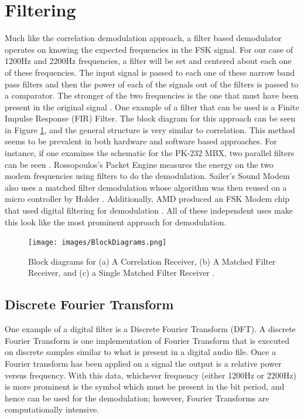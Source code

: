 \section{Filtering}
Much like the correlation demodulation approach, a filter based demodulator operates on knowing the expected frequencies in the FSK signal. For our case of 1200Hz and 2200Hz frequencies, a filter will be set and centered about each one of these frequencies. The input signal is passed to each one of these narrow band pass filters and then the power of each of the signals out of the filters is passed to a comparator. The stronger of the two frequencies is the one that must have been present in the original signal \cite{Watson1980}. One example of a filter that can be used is a Finite Impulse Response (FIR) Filter. The block diagram for this approach can be seen in Figure \ref{BlockDiagrams}, and the general structure is very similar to correlation. This method seems to be prevalent in both hardware and software based approaches. For instance, if one examines the schematic for the PK-232 MBX, two parallel filters can be seen \cite{Inc.2001}. Rossopoulos's Packet Engine measures the energy on the two modem frequencies using filters to do the demodulation. Sailer's Sound Modem also uses a matched filter demodulation \cite{Sailer1995} whose algorithm was then reused on a micro controller by Holder \cite{Holder2012}. Additionally, AMD produced an FSK Modem chip that used digital filtering for demodulation \cite{Devices1989}. All of these independent uses make this look like the most prominent approach for demodulation. 

\begin{figure}
  \centering
	\texttt{[image: images/BlockDiagrams.png]} 
	\caption{Block diagrams for (a) A Correlation Receiver, (b) A Matched Filter Receiver, and (c) a Single Matched Filter Receiver \cite{J.Das1986}.}
   \label{BlockDiagrams}
\end{figure}

\subsection{Discrete Fourier Transform}
One example of a digital filter is a Discrete Fourier Transform (DFT). A discrete Fourier Transform is one implementation of Fourier Transform that is executed on discrete samples similar to what is present in a digital audio file. Once a Fourier transform has been applied on a signal the output is a relative power versus frequency. With this data, whichever frequency (either 1200Hz or 2200Hz) is more prominent is the symbol which must be present in the bit period, and hence can be used for the demodulation; however, Fourier Transforms are computationally intensive.


